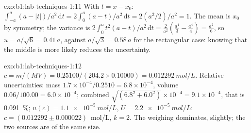 \begin{solution}{exo:b1:lab-techniques-1:11}
With $t = x - x_0$: $\int_{-a}^{a} (a - |t|)/a^2 \,\mathrm{d}t =
2 \int_0^a (a - t)/a^2 \,\mathrm{d}t = 2 (a^2/2)/a^2 = 1$. The mean is
$x_0$ by symmetry; the variance is $2 \int_0^a t^2 (a - t)/a^2
\,\mathrm{d}t = \frac{2}{a^2}\left(\frac{a^4}{3} - \frac{a^4}{4}\right) =
\frac{a^2}{6}$, so $u = a/\sqrt6 = 0.41\,a$, against $a/\sqrt3 = 0.58\,a$
for the rectangular case: knowing that the middle is more likely reduces
the uncertainty.
\end{solution}

\begin{solution}{exo:b1:lab-techniques-1:12}
$c = m/(MV) = 0.25100/(204.2 \times 0.10000) = \qty{0.012292}{mol/L}$.
Relative uncertainties: mass $1.7 \times 10^{-4}/0.2510 = 6.8 \times
10^{-4}$, volume $0.06/100.00 = 6.0 \times 10^{-4}$; combined
$\sqrt{(6.8^2 + 6.0^2)} \times 10^{-4} = 9.1 \times 10^{-4}$, that is
\qty{0.091}{\percent}; $u(c) = \qty{1.1e-5}{mol/L}$, $U = \qty{2.2e-5}{mol/L}$:
$c = (0.012292 \pm 0.000022)$~mol/L, $k = 2$. The weighing dominates,
slightly; the two sources are of the same size.
\end{solution}

